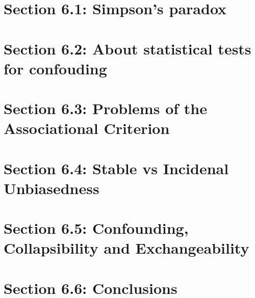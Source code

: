 \documentclass[oneside]{book}
\begin{document}
\section{Section 6.1: Simpson's paradox}



\section{Section 6.2: About statistical tests for confouding}



\section{Section 6.3: Problems of the Associational Criterion}



\section{Section 6.4: Stable vs Incidenal Unbiasedness}



\section{Section 6.5: Confounding, Collapsibility and Exchangeability}



\section{Section 6.6: Conclusions}


\end{document}
